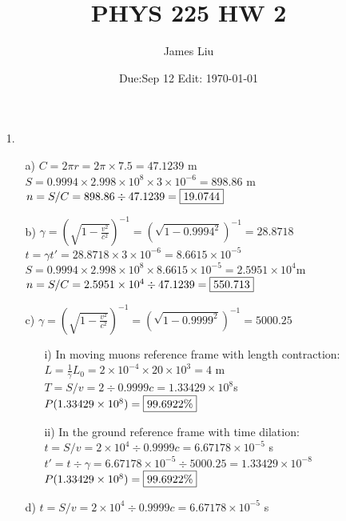 \documentclass{article}
\date{Due:Sep 12 Edit: \today}
\title{PHYS 225 HW 2}
\author{James Liu}
\begin{document}
\maketitle
\begin{itemize}
    \item[1.]
\begin{itemize}
    \item [a)] \(C = 2\pi r = 2\pi\times7.5=47.1239\) m \\ \(S = 0.9994\times 2.998\times 10^8\times3\times10^{-6}=898.86\) m
               \\ \(n = S/C = 898.86 \div 47.1239 = \fbox{19.0744}\)\\
    \item[b)] \(\displaystyle \gamma = \left(\sqrt{1-\frac{v^2}{c^2}}\right)^{-1}= \left(\sqrt{1-0.9994^2}\right)^{-1}=28.8718\)
                \\ \(t = \gamma t' = 28.8718 \times 3\times10^{-6}=8.6615 \times 10^{-5}\)\\
                \(S = 0.9994\times 2.998\times 10^8\times8.6615 \times 10^{-5}=2.5951\times10^4\)m
                \\ \(n = S/C = 2.5951\times10^4 \div 47.1239=\fbox{550.713}\)
    \item[c)] \(\displaystyle\gamma = \left(\sqrt{1-\frac{v^2}{c^2}}\right)^{-1}=\left(\sqrt{1-0.9999^2}\right)^{-1}=5000.25\) %
    \begin{itemize}
        \item [i)] In moving muons reference frame with length contraction:\\
            \(L = \frac{1}{\gamma}L_0 =2\times 10^{-4}\times 20\times 10^3 = 4\) m \\
            \(T = S/v = 2\div0.9999c = 1.33429\times10^8\)s\\
            \(P(1.33429\times10^8) = \fbox{99.6922\%}\)
        \item [ii)] In the ground reference frame with time dilation:\\
            \(t = S/v = 2\times 10^4 \div 0.9999c = 6.67178\times10^{-5}\) s\\
            \(t' = t\div \gamma = 6.67178\times10^{-5}\div5000.25 = 1.33429\times 10^{-8}\)\\
            \(P(1.33429\times10^8) = \fbox{99.6922\%}\)    
    \end{itemize}
    \item[d)]\(t = S/v = 2\times 10^4 \div 0.9999c = 6.67178\times10^{-5}\) s\\

\end{itemize}
\end{itemize}
\end{document}

